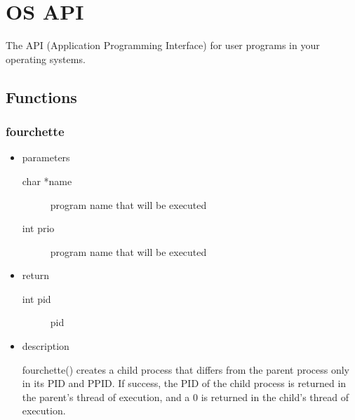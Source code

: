 \chapter{OS API}
The API (Application Programming Interface) for user programs in your operating systems.

\section{Functions}

\subsection{fourchette}
\begin{itemize}
\item{parameters}
\begin{description}
	\item[char *name] program name that will be executed
	\item[int prio] program name that will be executed
\end{description}
\item{return}
\begin{description}
	\item[int pid] pid
\end{description}
\item{description}

fourchette() creates a child process that differs from the parent process only in its PID and PPID.
If success, the PID of the child process is returned in the parent's thread of execution,
and a 0 is returned in the child's thread of execution.
\end{itemize}

